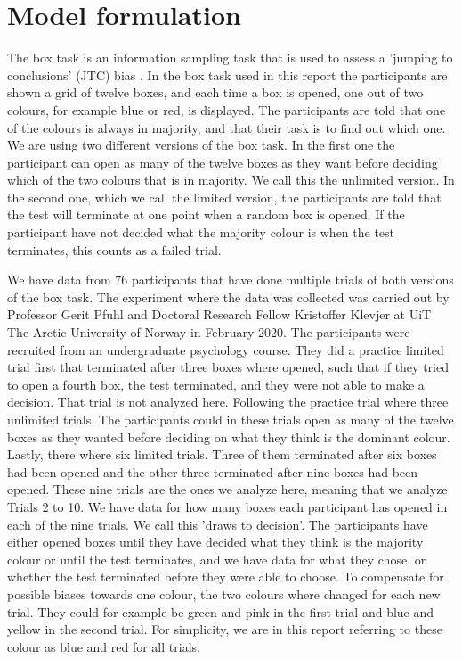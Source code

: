\newpage
\chapter{Model formulation}
\label{Chapter_Problem_setup}
The box task is an information sampling task that is used to assess a 'jumping to conclusions' (JTC) bias \citep{balzan2017}. In the box task used in this report the participants are shown a grid of twelve boxes, and each time a box is opened, one out of two colours, for example blue or red, is displayed. The participants are told that one of the colours is always in majority, and that their task is to find out which one. We are using two different versions of the box task. In the first one the participant can open as many of the twelve boxes as they want before deciding which of the two colours that is in majority. We call this the unlimited version. In the second one, which we call the limited version, the participants are told that the test will terminate at one point when a random box is opened. If the participant have not decided what the majority colour is when the test terminates, this counts as a failed trial. 

We have data from 76 participants that have done multiple trials of both versions of the box task. The experiment where the data was collected was carried out by Professor Gerit Pfuhl and Doctoral Research Fellow Kristoffer Klevjer at UiT The Arctic University of Norway in February 2020. The participants were recruited from an undergraduate psychology course. They did a practice limited trial first that terminated after three boxes where opened, such that if they tried to open a fourth box, the test terminated, and they were not able to make a decision. That trial is not analyzed here. Following the practice trial where three unlimited trials. The participants could in these trials open as many of the twelve boxes as they wanted before deciding on what they think is the dominant colour. Lastly, there where six limited trials. Three of them terminated after six boxes had been opened and the other three terminated after nine boxes had been opened. These nine trials are the ones we analyze here, meaning that we analyze Trials 2 to 10. We have data for how many boxes each participant has opened in each of the nine trials. We call this 'draws to decision'. The participants have either opened boxes until they have decided what they think is the majority colour or until the test terminates, and we have data for what they chose, or whether the test terminated before they were able to choose. To compensate for possible biases towards one colour, the two colours where changed for each new trial. They could for example be green and pink in the first trial and blue and yellow in the second trial. For simplicity, we are in this report referring to these colour as blue and red for all trials.

